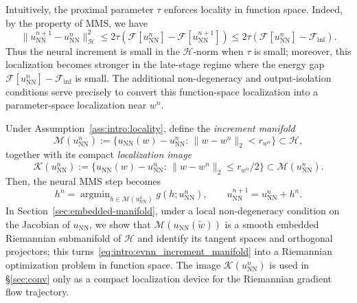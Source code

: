 \documentclass[twoside,11pt]{article}
\newcommand{\NN}{\mathrm{NN}}
\newcommand{\argmin}{\mathop{\mathrm{arg min}}}
\newcommand{\calF}{\mathcal{F}}
\newcommand{\calH}{\mathcal{H}}
\newcommand{\calK}{\mathcal{K}}
\newcommand{\calM}{\mathcal{M}}
\begin{document}
Intuitively, the proximal parameter $\tau$ enforces locality
in function space. Indeed, by the property of MMS, we have
\[
\|u^{n+1}_{\NN}-u^n_{\NN}\|_{\calH}^2
\le
2 \tau (\calF[u^n_{\NN}]-\calF[u^{n+1}_{\NN}])
\le
2 \tau (\calF[u^n_{\NN}]-\calF_{\inf}).
\]
Thus the neural increment is small in the $\calH$-norm when $\tau$ is small;
moreover, this localization becomes stronger in the late-stage regime where
the energy gap $\calF[u^n_{\NN}]-\calF_{\inf}$ is small. 
The additional non-degeneracy and output-isolation conditions serve precisely
to convert this function-space localization into a parameter-space localization
near $w^n$.

Under Assumption~\ref{ass:intro:locality}, define the \emph{increment manifold}
\begin{equation}\label{eq:intro:M_def}
\calM(u^n_{\NN}) := \Big\{u_{\NN}(w)-u^n_{\NN}:\,\|w-w^n\|_2 < r_{w^n}\Big\}\subset \calH,
\end{equation}
together with its compact \emph{localization image}
\begin{equation}\label{eq:intro:K_def}
\calK(u^n_{\NN}) := \Big\{u_{\NN}(w)-u^n_{\NN}:\,\|w-w^n\|_2 \le r_{w^n}/2\Big\}\subset \calM(u^n_{\NN}).
\end{equation}
Then, the neural MMS step becomes
\begin{equation}\label{eq:intro:evnn_increment_manifold}
h^n = \argmin_{h\in \calM(u^n_{\NN})} g(h;u^n_{\NN}),
\qquad
u^{n+1}_{\NN}=u^n_{\NN}+h^n.
\end{equation}
In Section~\ref{sec:embedded-manifold}, under a local non-degeneracy condition on the Jacobian of $u_\NN$, we show that $\calM(u_\NN(\tilde w))$ is a smooth embedded Riemannian submanifold of $\calH$ and identify its tangent spaces and orthogonal projectors; this turns~\eqref{eq:intro:evnn_increment_manifold} into a Riemannian optimization problem in function space. The image $\calK(u^n_{\NN})$ is used in §\ref{sec:conv} only as a compact localization device for the Riemannian gradient flow trajectory.
\end{document}
